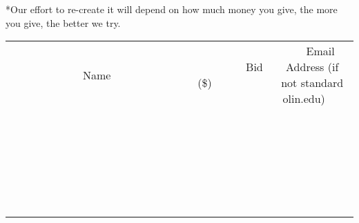 \documentclass[11pt]{article}
\begin{document}
*Our effort to re-create it will depend on how much money you give, the more you give, the better we try. \\[6ex]
\begin{tabular}{c c c}
~~~~~~~~~~~~~Name~~~~~~~~~~~~~ & ~~~~~~~~~Bid (\$)~~~~~~~~~ & ~~~Email Address (if not standard olin.edu)~~~ \\
 & & \\
\hline
 & & \\
\hline
 & & \\
\hline
 & & \\
\hline
 & & \\
\hline
 & & \\
\hline
 & & \\
\hline
 & & \\
\hline
 & & \\
\hline
 & & \\
\hline
 & & \\
\hline
 & & \\
\hline
 & & \\
\hline
 & & \\
\hline
 & & \\
\hline
 & & \\
\hline
 & & \\
\hline
 & & \\
\hline
 & & \\
\hline
 & & \\
\hline
 & & \\
\hline
 & & \\
\hline
 & & \\
\hline
 & & \\
\hline
 & & \\
\hline
 & & \\
\hline
\end{tabular}
\clearpage
\end{document}
